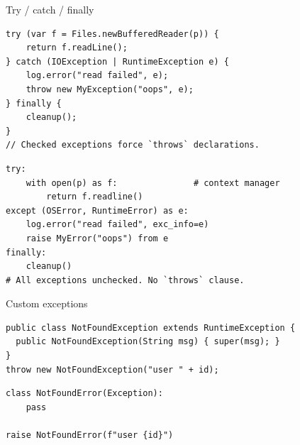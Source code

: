 \documentclass[10pt]{article}
\begin{document}

\begin{construct}{Try / catch / finally}
\noindent
\begin{minipage}[t]{0.485\linewidth}
\begin{lstlisting}[style=java, title=Java]
try (var f = Files.newBufferedReader(p)) {
    return f.readLine();
} catch (IOException | RuntimeException e) {
    log.error("read failed", e);
    throw new MyException("oops", e);
} finally {
    cleanup();
}
// Checked exceptions force `throws` declarations.
\end{lstlisting}
\end{minipage}\hfill
\begin{minipage}[t]{0.485\linewidth}
\begin{lstlisting}[style=python, title=Python]
try:
    with open(p) as f:               # context manager
        return f.readline()
except (OSError, RuntimeError) as e:
    log.error("read failed", exc_info=e)
    raise MyError("oops") from e
finally:
    cleanup()
# All exceptions unchecked. No `throws` clause.
\end{lstlisting}
\end{minipage}
\end{construct}

\begin{construct}{Custom exceptions}
\noindent
\begin{minipage}[t]{0.485\linewidth}
\begin{lstlisting}[style=java, title=Java]
public class NotFoundException extends RuntimeException {
  public NotFoundException(String msg) { super(msg); }
}
throw new NotFoundException("user " + id);
\end{lstlisting}
\end{minipage}\hfill
\begin{minipage}[t]{0.485\linewidth}
\begin{lstlisting}[style=python, title=Python]
class NotFoundError(Exception):
    pass

raise NotFoundError(f"user {id}")
\end{lstlisting}
\end{minipage}
\end{construct}

\end{document}
